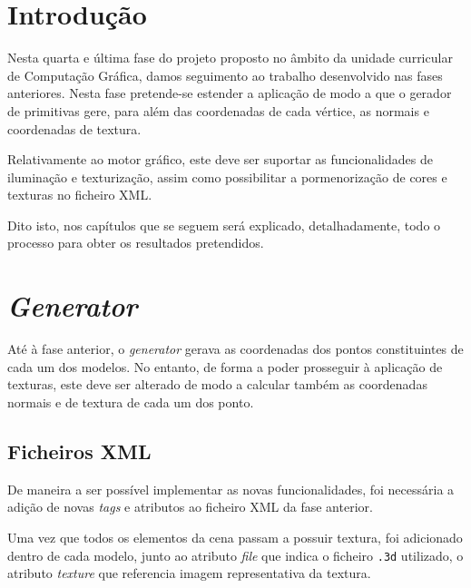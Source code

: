\documentclass[a4paper, 11pt]{article}
\begin{document}
\pagebreak

\tableofcontents
\listoffigures

\pagebreak


\pagestyle{fancy}
\fancyhf{}


\renewcommand{\headrulewidth}{0pt}

\section{Introdução}

Nesta quarta e última fase do projeto proposto no âmbito da unidade curricular de Computação 
Gráfica, damos seguimento ao trabalho desenvolvido nas fases anteriores. Nesta fase pretende-se 
estender a aplicação de modo a que o gerador de primitivas gere, para além das coordenadas de 
cada vértice, as normais e coordenadas de textura.

Relativamente ao motor gráfico, este deve ser suportar as funcionalidades de iluminação e 
texturização, assim como possibilitar a pormenorização de cores e texturas no ficheiro XML.

Dito isto, nos capítulos que se seguem será explicado, detalhadamente, todo o processo para obter 
os resultados pretendidos.

\pagebreak

\section{\textit{Generator}}

Até à fase anterior, o \textit{generator} gerava as coordenadas dos pontos constituintes de cada  
um dos modelos. No entanto, de forma a poder prosseguir à aplicação de texturas, este deve ser 
alterado de modo a calcular também as coordenadas normais e de textura de cada um dos ponto.

\subsection{Ficheiros XML}

De maneira a ser possível implementar as novas funcionalidades, foi necessária a adição de 
novas \textit{tags} e atributos ao ficheiro XML da fase anterior.

Uma vez que todos os elementos da cena passam a possuir textura, foi adicionado dentro de cada 
modelo, junto ao atributo \textit{file} que indica o ficheiro \texttt{.3d} utilizado, o atributo 
\textit{texture} que referencia imagem representativa da textura.
\end{document}
